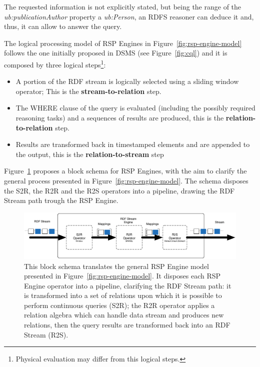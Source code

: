 The requested information is not explicitly stated, but being the range of the \textit{ub:publicationAuthor} property a \textit{ub:Person}, an RDFS reasoner can deduce it and, thus, it can allow to answer the query.

The logical processing model of RSP Engines in Figure~\ref{fig:rsp-engine-model} follows the one initially proposed in DSMS (see Figure~\ref{fig:cql}) and it is composed by three logical steps\footnote{Physical evaluation may differ from this logical steps.}: 
\begin{itemize}
\item[1.] A portion of the RDF stream is logically selected using a sliding window operator; This is the \textbf{stream-to-relation} step. 
\item[2.] The WHERE clause of the query is evaluated (including the possibly required reasoning tasks) and a sequences of results are produced, this is the \textbf{relation-to-relation} step.
\item[3.] Results are transformed back in timestamped elements and are appended to the output, this is the \textbf{relation-to-stream} step 
\end{itemize}

Figure~\ref{fig:rsp-engine-schema} proposes a block schema for RSP Engines, with the aim to clarify the general process presented in Figure~\ref{fig:rsp-engine-model}. The schema disposes the S2R, the R2R and the R2S operators into a pipeline, drawing the RDF Stream path trough the RSP Engine.


\begin{figure}[tbh]
  \centering
	\includegraphics[width=\linewidth]{images/rsp-block-schema}
	\caption[RSP Engine Block Schema]{This block schema translates the general RSP Engine model presented in Figure~\ref{fig:rsp-engine-model}. It disposes each RSP Engine operator into a pipeline, clarifying the RDF Stream path: it is transformed into a set of relations upon which it is possible to perform continuous queries (S2R); the R2R operator applies a relation algebra which can handle data stream and produces new relations, then the query results are transformed back into an RDF Stream (R2S).}
  	\label{fig:rsp-engine-schema}
\end{figure}


